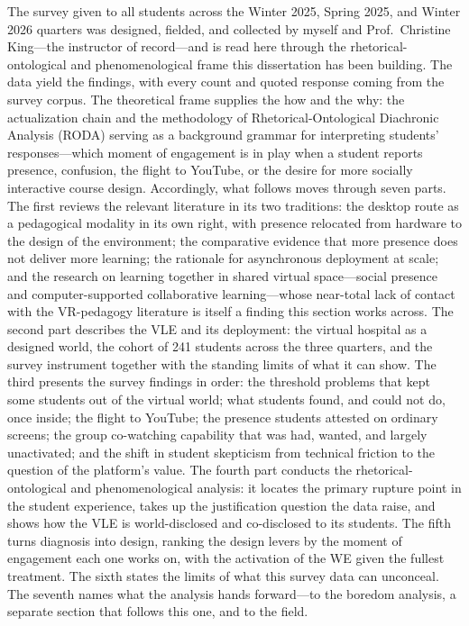 The survey given to all students across the Winter 2025, Spring 2025, and
Winter 2026 quarters was designed, fielded, and collected by myself and
Prof.\ Christine King---the instructor of record---and is read here
through the rhetorical-ontological and phenomenological frame this dissertation
has been building. The data yield the findings, with every count and quoted
response coming from the survey corpus. The theoretical frame supplies the how
and the why: the actualization chain and the methodology of
Rhetorical-Ontological Diachronic Analysis (RODA) serving as a background
grammar for interpreting students' responses---which moment of engagement is in play when a
student reports presence, confusion, the flight to YouTube, or the desire for
more socially interactive course design. Accordingly, what follows moves through
seven parts. The first reviews the relevant literature in its two traditions:
the desktop route as a pedagogical modality in its own right, with presence
relocated from hardware to the design of the environment; the comparative
evidence that more presence does not deliver more learning; the rationale for
asynchronous deployment at scale; and the research on learning together in
shared virtual space---social presence and computer-supported collaborative
learning---whose near-total lack of contact with the VR-pedagogy literature is
itself a finding this section works across. The second part describes the VLE
and its deployment: the virtual hospital as a designed world, the cohort of 241
students across the three quarters, and the survey instrument together with the
standing limits of what it can show. The third presents the survey findings in
order: the threshold problems that kept some students out of the virtual world;
what students found, and could not do, once inside; the flight to YouTube; the
presence students attested on ordinary screens; the group co-watching capability
that was had, wanted, and largely unactivated; and the shift in student
skepticism from technical friction to the question of the platform's value. The
fourth part conducts the rhetorical-ontological and phenomenological analysis:
it locates the primary rupture point in the student experience, takes up the
justification question the data raise, and shows how the VLE is world-disclosed
and co-disclosed to its students. The fifth turns diagnosis into design, ranking
the design levers by the moment of engagement each one works on, with the
activation of the WE given the fullest treatment. The sixth states the limits of
what this survey data can unconceal. The seventh names what the analysis hands
forward---to the boredom analysis, a separate section that follows this one, and
to the field.

